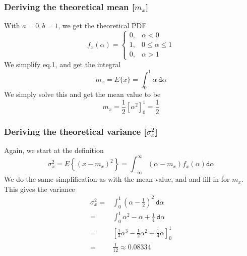 \documentclass[compress]{beamer}
\begin{document}
\begin{frame}
    \frametitle{Deriving the theoretical mean [$m_x$]}
    With $a = 0, b = 1$, we get the theoretical PDF
    \begin{equation*}
        f_x(\alpha) = 
        \begin{cases}
            0, & \alpha < 0 \\
            1, & 0 \le \alpha \le 1 \\
            0, & \alpha > 1 
        \end{cases}
    \end{equation*}
    We simplify eq.1, and get the integral
    \begin{equation*}
        m_x = E\{x\} = \int_0^1\alpha \ \texttt{d}\alpha
    \end{equation*}
    We simply solve this and get the mean value to be
    \begin{equation*}
        m_x = \frac{1}{2} \left[\alpha^2\right]_0^1=\frac{1}{2}
    \end{equation*}
\end{frame}
\begin{frame}
    \frametitle{Deriving the theoretical variance [$\sigma_x^2$]}
    Again, we start at the definition
    \begin{equation}
        \sigma_x^2=E\left\{(x-m_x)^2\right\}=\int_{-\infty}^{\infty}
        (\alpha - m_x) f_x( \alpha ) \texttt{d}\alpha
    \end{equation}
    We do the same simplification as with the mean value, and and fill in for $m_x$.
    This gives the variance
    \begin{align*}
        \sigma_x^2=& \int_0^1\left(\alpha-\frac{1}{2}\right)^2\ \texttt{d}\alpha \\
        =& \int_0^1 \alpha^2-\alpha+\frac{1}{4}\ \texttt{d} \alpha \\
        =& \left[\frac{1}{3}\alpha^3-\frac{1}{2}\alpha^2+\frac{1}{4}\alpha\right]^1_0 \\
        =& \frac{1}{12} \approx 0.08334
    \end{align*}
\end{frame}
\end{document}
